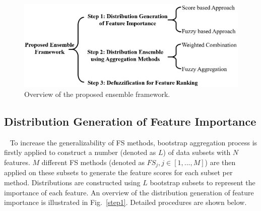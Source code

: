\documentclass[conference]{IEEEtran}
\begin{document}
\begin{figure}[h]
	\centering
	\includegraphics[width=1\columnwidth]{Figures/General_Framework.png}
	\caption{Overview of the proposed ensemble framework.}
	\label{general_framework}
\end{figure}


\subsection{Distribution Generation of Feature Importance}~\label{Step1_section}
To increase the generalizability of FS methods, bootstrap aggregation process is firstly applied to construct a number (denoted as $L$) of data subsets with $N$ features. $M$ different FS methods (denoted as $FS_j, j \in [1, ..., M]$) are then applied on these subsets to generate the feature scores for each subset per method. Distributions are constructed using $L$ bootstrap subsets to represent the importance of each feature. An overview of the distribution generation of feature importance is illustrated in Fig.~\ref{step1}. Detailed procedures are shown below.
\end{document}
